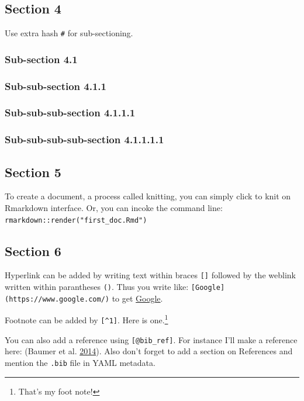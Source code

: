 \documentclass[12pt,]{article}
\let\rmarkdownfootnote\footnote%
\def\footnote{\protect\rmarkdownfootnote}
\begin{document}
\subsection{Section 4}\label{section-4}

Use extra hash \texttt{\#} for sub-sectioning.

\subsubsection{Sub-section 4.1}\label{sub-section-4.1}

\subsubsection{Sub-sub-section 4.1.1}\label{sub-sub-section-4.1.1}

\subsubsection{Sub-sub-sub-section
4.1.1.1}\label{sub-sub-sub-section-4.1.1.1}

\subsubsection{Sub-sub-sub-sub-section
4.1.1.1.1}\label{sub-sub-sub-sub-section-4.1.1.1.1}

\subsection{Section 5}\label{section-5}

To create a document, a process called knitting, you can simply click to
knit on Rmarkdown interface. Or, you can incoke the command line:
\texttt{rmarkdown::render("first\_doc.Rmd")}

\subsection{Section 6}\label{section-6}

Hyperlink can be added by writing text within braces \texttt{{[}{]}}
followed by the weblink written within parantheses \texttt{()}. Thus you
write like: \texttt{{[}Google{]}(https://www.google.com/)} to get
\href{https://www.google.com/}{Google}.

Footnote can be added by \texttt{{[}\^{}1{]}}. Here is one.\footnote{That's
  my foot note!}

You can also add a reference using \texttt{{[}@bib\_ref{]}}. For
instance I'll make a reference here: (Baumer et al.
\protect\hyperlink{ref-baumer2014r}{2014}). Also don't forget to add a
section on References and mention the \texttt{.bib} file in YAML
metadata.
\end{document}
